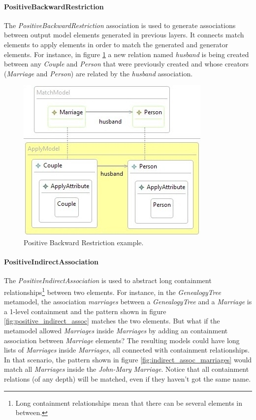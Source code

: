 \paragraph{PositiveBackwardRestriction}

The \emph{PositiveBackwardRestriction} association is used to generate
associations between output model elements generated in previous layers. It
connects match elements to apply elements in order to match the generated and
generator elements. For instance, in figure
\ref{fig:positive_backward_restriction_example} a new relation named
\emph{husband} is being created between any \emph{Couple} and \emph{Person} that
were previously created and whose creators (\emph{Marriage} and \emph{Person})
are related by the \emph{husband} association.


\begin{figure}[h]
\begin{center}
  \includegraphics[scale=0.7]{imgs/positive_backward_restriction_example.jpg}
  \caption{Positive Backward Restriction example.}
  \label{fig:positive_backward_restriction_example}
\end{center}
\end{figure}



\paragraph{PositiveIndirectAssociation}

The \emph{PositiveIndirectAssociation} is used to abstract long containment
relationships\footnote{Long containment relationships mean that there can be
several elements in between.} between two elements. For instance, in the
\emph{GenealogyTree} metamodel, the association \emph{marriages} between a
\emph{GenealogyTree} and a \emph{Marriage} is a 1-level containment and the
pattern shown in figure \ref{fig:positive_indirect_assoc} matches the two
elements. But what if the metamodel allowed \emph{Marriages} inside
\emph{Marriages} by adding an containment association between \emph{Marriage}
elements? The resulting models could have long lists of \emph{Marriages} inside
\emph{Marriages}, all connected with containment relationships. In that
scenario, the pattern shown in figure \ref{fig:indirect_assoc_marriages} would
match all \emph{Marriages} inside the \emph{John-Mary} \emph{Marriage}. Notice
that all containment relations (of any depth) will be matched, even if they
haven't got the same name.

